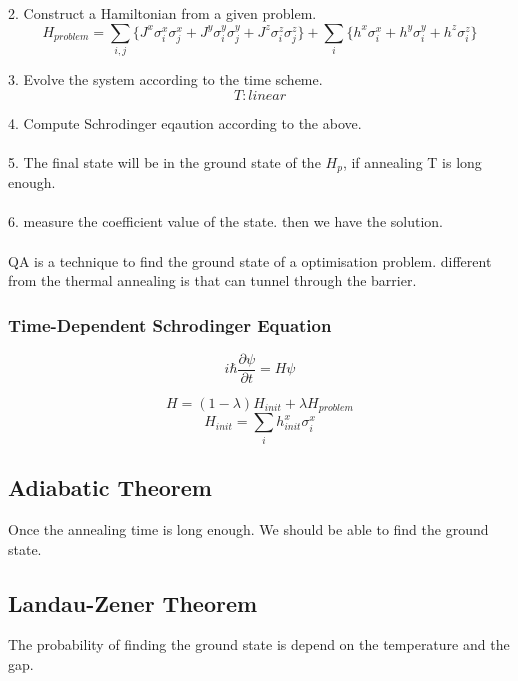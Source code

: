\documentclass[twoside,a4paper,article]{combine}
\begin{document}
2. Construct a Hamiltonian from a given problem.
\begin{equation*}
	H_{problem}=\sum_{i,j} \{J^x \sigma^x_i \sigma^x_j+J^y \sigma^y_i \sigma^y_j+J^z \sigma^z_i \sigma^z_j \}+ \sum_{i} \{h^x \sigma^x_i+h^y \sigma^y_i+h^z \sigma^z_i\}
\end{equation*}   

3. Evolve the system according to the time scheme.
\begin{equation*}
	T:linear 
\end{equation*}

4. Compute Schrodinger eqaution according to the above.\\
\\
5. The final state will be in the ground state of the $H_p$, if annealing T is long enough.\\
\\
6. measure the coefficient value of the state. then we have the solution.\\
\\



QA is a technique to find the ground state of a optimisation problem. different from the thermal annealing is that can tunnel through the barrier. 


\subsubsection{Time-Dependent Schrodinger Equation}
\begin{equation*}
i\hbar\frac{\partial \psi}{\partial t}=H\psi
\end{equation*}

\begin{equation*}
H=(1-\lambda)H_{init}+\lambda H_{problem}
\end{equation*}
\begin{equation*}
H_{init}=\sum_{i} h^x_{init} \sigma^x_i
\end{equation*}


\subsection{Adiabatic Theorem}
Once the annealing time is long enough. We should be able to find the ground state.
\subsection{Landau-Zener Theorem}
The probability of finding the ground state is depend on the temperature and the gap.
\end{document}
